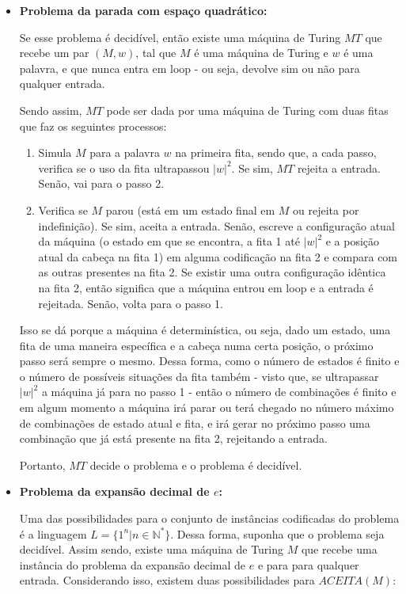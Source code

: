 \documentclass{article}
\begin{document}
{
\color{blue}
  \begin{itemize}
    \item \textbf{Problema da parada com espaço quadrático:}
      \par Se esse problema é decidível, então existe uma máquina de Turing $MT$ que recebe um par $(M, w)$, tal que $M$ é uma máquina de Turing e $w$ é uma palavra, e que nunca entra em loop - ou seja, devolve sim ou não para qualquer entrada.
      \par Sendo assim, $MT$ pode ser dada por uma máquina de Turing com duas fitas que faz os seguintes processos:
      \begin{enumerate}
        \item Simula $M$ para a palavra $w$ na primeira fita, sendo que, a cada passo, verifica se o uso da fita ultrapassou $|w|^2$. Se sim, $MT$ rejeita a entrada. Senão, vai para o passo 2.
        \item Verifica se $M$ parou (está em um estado final em $M$ ou rejeita por indefinição). Se sim, aceita a entrada. Senão, escreve a configuração atual da máquina (o estado em que se encontra, a fita 1 até $|w|^2$ e a posição atual da cabeça na fita 1) em alguma codificação na fita 2 e compara com as outras presentes na fita 2. Se existir uma outra configuração idêntica na fita 2, então significa que a máquina entrou em loop e a entrada é rejeitada. Senão, volta para o passo 1.
      \end{enumerate}
      \par Isso se dá porque a máquina é determinística, ou seja, dado um estado, uma fita de uma maneira específica e a cabeça numa certa posição, o próximo passo será sempre o mesmo. Dessa forma, como o número de estados é finito e o número de possíveis situações da fita também - visto que, se ultrapassar $|w|^2$ a máquina já para no passo 1 - então o número de combinações é finito e em algum momento a máquina irá parar ou terá chegado no número máximo de combinações de estado atual e fita, e irá gerar no próximo passo uma combinação que já está presente na fita 2, rejeitando a entrada.
      \par Portanto, $MT$ decide o problema e o problema é decidível.
    \item \textbf{Problema da expansão decimal de $e$:}
      \par Uma das possibilidades para o conjunto de instâncias codificadas do problema é a linguagem $L = \{ 1^n|n\in\mathds{N}^*\}$. Dessa forma, suponha que o problema seja decidível. Assim sendo, existe uma máquina de Turing $M$ que recebe uma instância do problema da expansão decimal de $e$ e para para qualquer entrada. Considerando isso, existem duas possibilidades para $ACEITA(M)$:

\end{itemize}}
\end{document}
